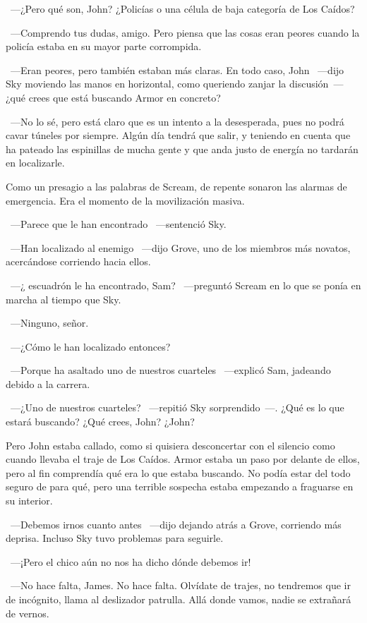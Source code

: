 ~---¿Pero qué son, John? ¿Policías o una célula de baja categoría de Los Caídos?

~---Comprendo tus dudas, amigo. Pero piensa que las cosas eran peores cuando la policía estaba en su mayor parte corrompida.

~---Eran peores, pero también estaban más claras. En todo caso, John ~---dijo Sky moviendo las manos en horizontal, como queriendo zanjar la discusión~--- ¿qué crees que está buscando Armor en concreto?

~---No lo sé, pero está claro que es un intento a la desesperada, pues no podrá cavar túneles por siempre. Algún día tendrá que salir, y teniendo en cuenta que ha pateado las espinillas de mucha gente y que anda justo de energía no tardarán en localizarle.

Como un presagio a las palabras de Scream, de repente sonaron las alarmas de emergencia. Era el momento de la movilización masiva.

~---Parece que le han encontrado ~---sentenció Sky.

~---Han localizado al enemigo ~---dijo Grove, uno de los miembros más novatos, acercándose corriendo hacia ellos.

~---¿ escuadrón le ha encontrado, Sam? ~---preguntó Scream en lo que se ponía en marcha al tiempo que Sky.

~---Ninguno, señor.

~---¿Cómo le han localizado entonces?

~---Porque ha asaltado uno de nuestros cuarteles ~---explicó Sam, jadeando debido a la carrera.

~---¿Uno de nuestros cuarteles? ~---repitió Sky sorprendido~---. ¿Qué es lo que estará buscando? ¿Qué crees, John? ¿John?

Pero John estaba callado, como si quisiera desconcertar con el silencio como cuando llevaba el traje de Los Caídos. Armor estaba un paso por delante de ellos, pero al fin comprendía qué era lo que estaba buscando. No podía estar del todo seguro de para qué, pero una terrible sospecha estaba empezando a fraguarse en su interior.

~---Debemos irnos cuanto antes ~---dijo dejando atrás a Grove, corriendo más deprisa. Incluso Sky tuvo problemas para seguirle.

~---¡Pero el chico aún no nos ha dicho dónde debemos ir!

~---No hace falta, James. No hace falta. Olvídate de trajes, no tendremos que ir de incógnito, llama al deslizador patrulla. Allá donde vamos, nadie se extrañará de vernos.

